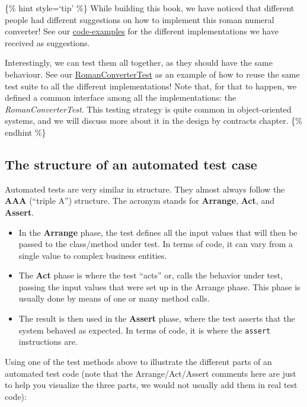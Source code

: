\{\% hint style=`tip' \%\} While building this book, we have noticed
that different people had different suggestions on how to implement this
roman numeral converter! See our
\href{https://github.com/sttp-book/code-examples/tree/master/src/main/java/tudelft/dbc/roman}{code-examples}
for the different implementations we have received as suggestions.

Interestingly, we can test them all together, as they should have the
same behaviour. See our
\href{https://github.com/sttp-book/code-examples/blob/master/src/test/java/tudelft/dbc/roman/RomanConverterTest.java}{RomanConverterTest}
as an example of how to reuse the same test suite to all the different
implementations! Note that, for that to happen, we defined a common
interface among all the implementations: the \emph{RomanConverterTest}.
This testing strategy is quite common in object-oriented systems, and we
will discuss more about it in the design by contracts chapter. \{\%
endhint \%\}

\hypertarget{the-structure-of-an-automated-test-case}{%
\subsection{The structure of an automated test
case}\label{the-structure-of-an-automated-test-case}}

Automated tests are very similar in structure. They almost always follow
the \textbf{AAA} (``triple A'') structure. The acronym stands for
\textbf{Arrange}, \textbf{Act}, and \textbf{Assert}.

\begin{itemize}
\item
  In the \textbf{Arrange} phase, the test defines all the input values
  that will then be passed to the class/method under test. In terms of
  code, it can vary from a single value to complex business entities.
\item
  The \textbf{Act} phase is where the test ``acts'' or, calls the
  behavior under test, passing the input values that were set up in the
  Arrange phase. This phase is usually done by means of one or many
  method calls.
\item
  The result is then used in the \textbf{Assert} phase, where the test
  asserts that the system behaved as expected. In terms of code, it is
  where the \texttt{assert} instructions are.
\end{itemize}

Using one of the test methods above to illustrate the different parts of
an automated test code (note that the Arrange/Act/Assert comments here
are just to help you visualize the three parts, we would not usually add
them in real test code):

